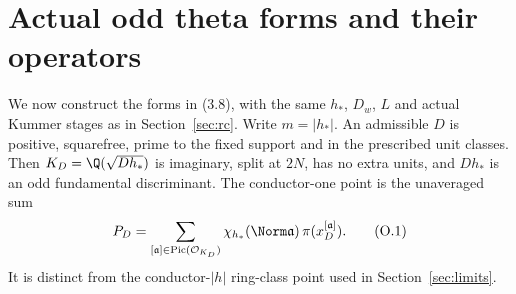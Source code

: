 

\section{Actual odd theta forms and their operators}\label{app:odd-source}
We now construct the forms in (3.8), with the same $h_*$, $D_w$, $L$
and actual Kummer stages as in Section~\ref{sec:rc}.
Write $m=|h_*|$. An admissible $D$ is positive, squarefree, prime to
the fixed support and in the prescribed unit classes. Then
$K_D=\Q(\sqrt{Dh_*})$ is imaginary, split at $2N$, has no extra
units, and $Dh_*$ is an odd fundamental discriminant.
The conductor-one point is the unaveraged sum
\[
 P_D=\sum_{[\mathfrak a]\in\operatorname{Pic}(\mathcal O_{K_D})}
       \chi_{h_*}(\Norm\mathfrak a)\,
                         \pi(x_D^{[\mathfrak a]}).               \tag{O.1}
\]
It is distinct from the conductor-$|h|$ ring-class point used in
Section~\ref{sec:limits}.

